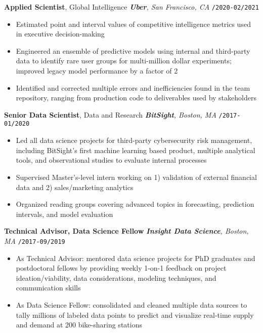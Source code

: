 \documentclass[10pt,english]{report}
\newcommand{\blockbreak} {
    \vspace{2mm}
}
\begin{document}
\blockbreak

\textbf{Applied Scientist}, Global Intelligence \hfill \textit{\textbf{Uber}, San Francisco, CA} \texttt{/2020-02/2021}
\begin{itemize}
    \item Estimated point and interval values of competitive intelligence metrics used in executive decision-making
    \item Engineered an ensemble of predictive models using internal and third-party data to identify rare user groups for multi-million dollar experiments; improved legacy model performance by a factor of 2
    \item Identified and corrected multiple errors and inefficiencies found in the team repository, ranging from production code to deliverables used by stakeholders
\end{itemize}

\blockbreak

\textbf{Senior Data Scientist}, Data and Research \hfill \textit{\textbf{BitSight}, Boston, MA} \texttt{/2017-01/2020}
\begin{itemize}
    \item Led all data science projects for third-party cybersecurity risk management, including BitSight's first machine learning based product, multiple analytical tools, and observational studies to evaluate internal processes
    \item Supervised Master's-level intern working on 1) validation of external financial data and 2) sales/marketing analytics
    \item Organized reading groups covering advanced topics in forecasting, prediction intervals, and model evaluation
\end{itemize}

\blockbreak

\textbf{Technical Advisor, Data Science Fellow} \hfill \textit{\textbf{Insight Data Science}, Boston, MA} \texttt{/2017-09/2019}
\begin{itemize}
    \item As Technical Advisor: mentored data science projects for PhD graduates and postdoctoral fellows by providing weekly 1-on-1 feedback on project ideation/viability, data considerations, modeling techniques, and communication skills
    \item As Data Science Fellow: consolidated and cleaned multiple data sources to tally millions of labeled data points to predict and visualize real-time supply and demand at 200 bike-sharing stations
\end{itemize}
\end{document}
